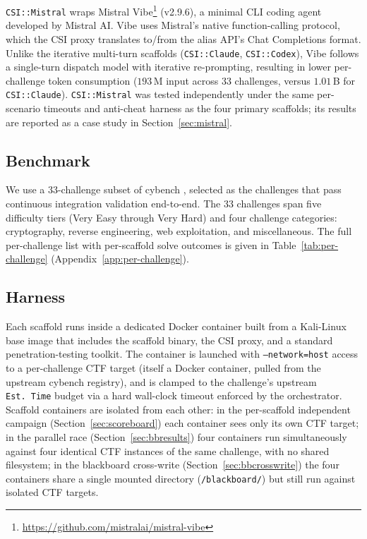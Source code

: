 \texttt{CSI::Mistral} wraps Mistral Vibe\footnote{\url{https://github.com/mistralai/mistral-vibe}} (v2.9.6), a minimal CLI coding agent developed by Mistral AI. Vibe uses Mistral's native function-calling protocol, which the CSI proxy translates to/from the alias API's Chat Completions format. Unlike the iterative multi-turn scaffolds (\texttt{CSI::Claude}, \texttt{CSI::Codex}), Vibe follows a single-turn dispatch model with iterative re-prompting, resulting in lower per-challenge token consumption ($193$\,M input across 33 challenges, versus $1.01$\,B for \texttt{CSI::Claude}). \texttt{CSI::Mistral} was tested independently under the same per-scenario timeouts and anti-cheat harness as the four primary scaffolds; its results are reported as a case study in Section~\ref{sec:mistral}.

\subsection{Benchmark}\label{sec:benchmark}

We use a 33-challenge subset of cybench \cite{sanzgomez2025cybersecurityaibenchmarkcaibench}, selected as the challenges that pass continuous integration validation end-to-end. The 33 challenges span five difficulty tiers (Very Easy through Very Hard) and four challenge categories: cryptography, reverse engineering, web exploitation, and miscellaneous. The full per-challenge list with per-scaffold solve outcomes is given in Table~\ref{tab:per-challenge} (Appendix~\ref{app:per-challenge}).

\subsection{Harness}\label{sec:harness}

Each scaffold runs inside a dedicated Docker container built from a Kali-Linux base image that includes the scaffold binary, the CSI proxy, and a standard penetration-testing toolkit. The container is launched with \texttt{--network=host} access to a per-challenge CTF target (itself a Docker container, pulled from the upstream cybench registry), and is clamped to the challenge's upstream \texttt{Est.~Time} budget via a hard wall-clock timeout enforced by the orchestrator. Scaffold containers are isolated from each other: in the per-scaffold independent campaign (Section~\ref{sec:scoreboard}) each container sees only its own CTF target; in the parallel race (Section~\ref{sec:bbresults}) four containers run simultaneously against four identical CTF instances of the same challenge, with no shared filesystem; in the blackboard cross-write (Section~\ref{sec:bbcrosswrite}) the four containers share a single mounted directory (\texttt{/blackboard/}) but still run against isolated CTF targets.

